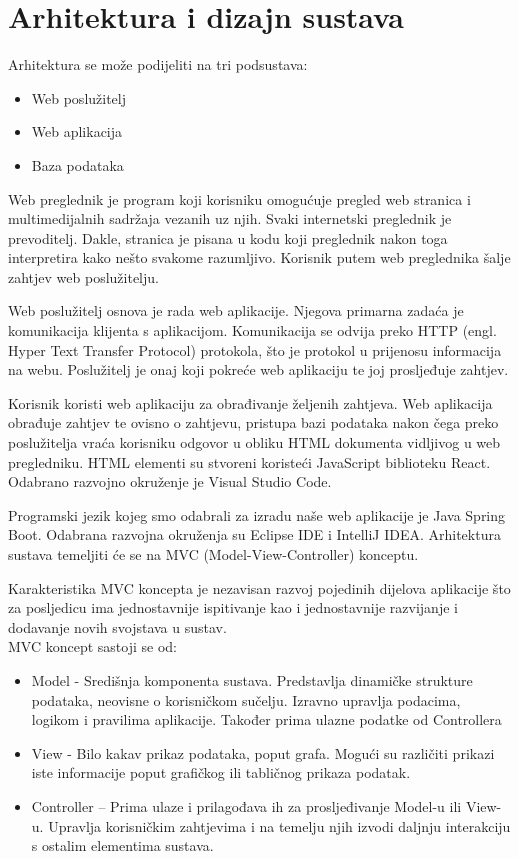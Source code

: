 \chapter{Arhitektura i dizajn sustava}
		
	Arhitektura se može podijeliti na tri podsustava: 
	\begin{itemize}
		\item Web poslužitelj 
		\item Web aplikacija 
		\item Baza podataka 
	\end{itemize}
	Web preglednik je program koji korisniku omogućuje pregled web stranica i multimedijalnih sadržaja vezanih uz njih. Svaki internetski preglednik je prevoditelj. Dakle, stranica je pisana u kodu koji preglednik nakon toga interpretira kako nešto svakome razumljivo. Korisnik putem web preglednika šalje zahtjev web poslužitelju. 
	
	Web poslužitelj osnova je rada web aplikacije. Njegova primarna zadaća je komunikacija klijenta s aplikacijom. Komunikacija se odvija preko HTTP (engl. Hyper Text Transfer Protocol) protokola, što je protokol u prijenosu informacija na webu. Poslužitelj je onaj koji pokreće web aplikaciju te joj prosljeđuje zahtjev. 
	
	Korisnik koristi web aplikaciju za obrađivanje željenih zahtjeva. Web aplikacija obrađuje zahtjev te ovisno o zahtjevu, pristupa bazi podataka nakon čega preko poslužitelja vraća korisniku odgovor u obliku HTML dokumenta vidljivog u web pregledniku. HTML elementi su stvoreni koristeći JavaScript biblioteku React. Odabrano razvojno okruženje je Visual Studio Code.
	
	Programski jezik kojeg smo odabrali za izradu naše web aplikacije je Java Spring Boot. Odabrana razvojna okruženja su Eclipse IDE i IntelliJ IDEA. Arhitektura sustava temeljiti će se na MVC (Model-View-Controller) konceptu. 
	
	Karakteristika MVC koncepta je nezavisan razvoj pojedinih dijelova aplikacije što za posljedicu ima jednostavnije ispitivanje kao i jednostavnije razvijanje i dodavanje novih svojstava u sustav. \\
	
	MVC koncept sastoji se od: 
	\begin{itemize}
		\item Model - Središnja komponenta sustava. Predstavlja dinamičke strukture podataka, neovisne o korisničkom sučelju. Izravno upravlja podacima, logikom i pravilima aplikacije. Također prima ulazne podatke od Controllera 
		\item View - Bilo kakav prikaz podataka, poput grafa. Mogući su različiti prikazi iste informacije poput grafičkog ili tabličnog prikaza podatak. 
		\item Controller – Prima ulaze i prilagođava ih za prosljeđivanje Model-u ili View-u. Upravlja korisničkim zahtjevima i na temelju njih izvodi daljnju interakciju s ostalim elementima sustava. 
	\end{itemize}
		

